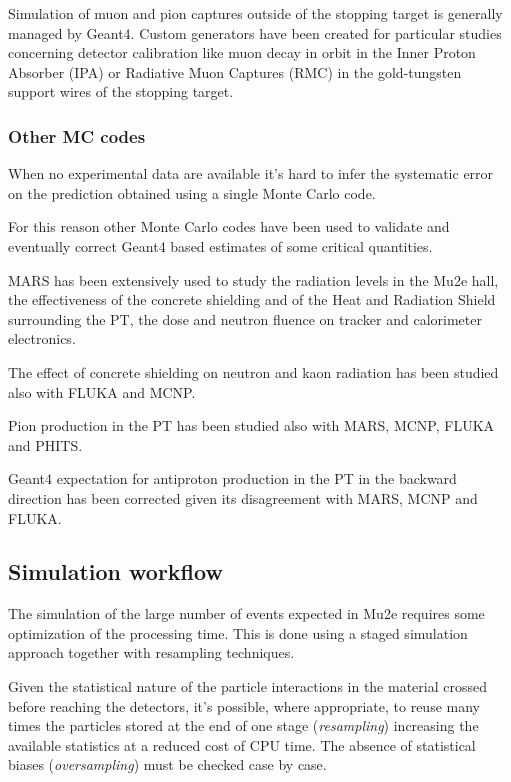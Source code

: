 Simulation of muon and pion captures outside of the stopping target is generally managed by Geant4. Custom generators have been created for particular studies concerning detector calibration like muon decay in orbit in the Inner Proton Absorber (IPA) or Radiative Muon Captures (RMC) in the gold-tungsten support wires of the stopping target.   

\subsubsection{ Other MC codes}

When no experimental data are available it's hard to infer the systematic error on the prediction obtained using a single Monte Carlo code.

For this reason other Monte Carlo codes have been used to validate and eventually correct Geant4 based estimates of some critical quantities.

MARS has been extensively used to study the radiation levels in the Mu2e hall, the effectiveness of the concrete shielding and of the Heat and Radiation Shield surrounding the PT, the dose and neutron fluence on tracker and calorimeter electronics.

The effect of concrete shielding on neutron and kaon radiation has been studied also with FLUKA and MCNP.
 
Pion production in the PT has been studied also with MARS, MCNP, FLUKA and PHITS.
  
Geant4 expectation for antiproton production in the PT in the backward direction has been corrected given its disagreement with MARS, MCNP and FLUKA\cite{SU2020:2023}. 


\subsection{ Simulation workflow}

The simulation of the large number of events expected in Mu2e requires some optimization of the processing time.
This is done using a staged simulation approach together with resampling techniques.

Given the statistical nature of the particle interactions in the material crossed before reaching the detectors, it's possible, where appropriate, to reuse many times the particles stored at the end of one stage ({\em resampling}) increasing the available statistics at a reduced cost of CPU time. The absence of statistical biases ({\em oversampling}) must be checked case by case.

